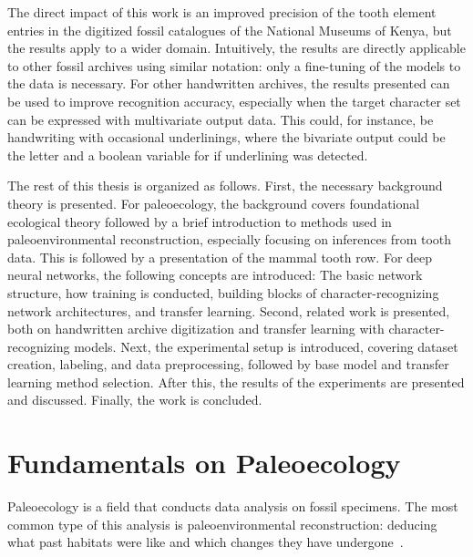 \documentclass[english,twoside,openright]{UH_DS_MSc}
\begin{document}
The direct impact of this work is an improved precision of the tooth element entries in the digitized 
fossil catalogues of the National Museums of Kenya, but the results apply to a wider domain.
Intuitively, the results are directly applicable to other fossil archives using similar notation: only a fine-tuning of the 
models to the data is necessary.
For other handwritten archives, the results presented can be used to improve recognition accuracy, especially when the target character set can be expressed with multivariate output data. This could, for 
instance, be handwriting with occasional underlinings, where the bivariate output could be the letter and a boolean variable for if underlining was detected.

The rest of this thesis is organized as follows. First, the necessary background theory is 
presented. For paleoecology, the background covers 
foundational ecological theory followed by a brief introduction to methods used in
paleoenvironmental reconstruction, especially focusing on inferences from tooth data. This is
followed by a presentation of the mammal tooth row.
For deep neural networks, the following concepts are introduced:
The basic network structure, how training is conducted, building blocks of character-recognizing network architectures, and transfer learning. 
Second, related work is presented, both on
handwritten archive digitization and transfer learning with character-recognizing models.
Next, the experimental setup is introduced, covering dataset creation, labeling, and data 
preprocessing, followed by base model and transfer learning method selection. After this, 
the results of the experiments are presented and discussed. Finally, the work is concluded.

\chapter{Fundamentals on Paleoecology}

Paleoecology is a field that conducts data analysis on fossil specimens. The most common type of 
this analysis is paleoenvironmental reconstruction: deducing what past habitats were like and which 
changes they have undergone~\cite{Faith_Lyman_2019_ch2}.
\end{document}
